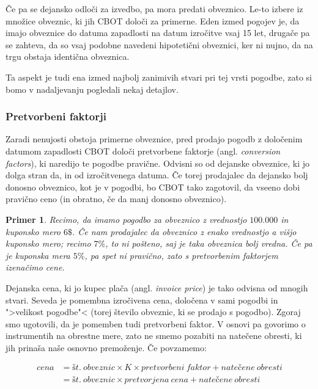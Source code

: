 \documentclass[a4paper, 11pt]{article}
\newtheorem{primer}{Primer}
\begin{document}
Če pa se dejansko odloči za izvedbo, pa mora predati obveznico. Le-to izbere iz množice obveznic, ki jih
CBOT določi za primerne. Eden izmed pogojev je, da imajo obveznice do datuma zapadlosti na datum izročitve
vsaj 15 let, drugače pa se zahteva, da so vsaj podobne navedeni hipotetični obveznici, ker ni nujno, da na
trgu obstaja identična obveznica. 

Ta aspekt je tudi ena izmed najbolj zanimivih stvari pri tej vrsti pogodbe, zato si bomo v nadaljevanju 
pogledali nekaj detajlov.


\subsubsection{Pretvorbeni faktorji}
Zaradi nenujosti obstoja primerne obveznice, pred prodajo pogodb z določenim datumom zapadlosti CBOT 
določi pretvorbene faktorje (angl. \textit{conversion factors}), ki naredijo te pogodbe pravične. 
Odvisni so od dejanske obveznice, ki jo dolga stran da, in od izročitvenega datuma. Če torej prodajalec
da dejansko bolj donosno obveznico, kot je v pogodbi, bo CBOT tako zagotovil, da vseeno dobi pravično
ceno (in obratno, če da manj donosno obveznico).

\begin{primer}
    Recimo, da imamo pogodbo za obveznico z vrednostjo \textdollar$100.000$ in kuponsko mero $6\$$. 
    Če nam prodajalec da obveznico z enako vrednostjo a višjo kuponsko mero; recimo $7\%$, to ni 
    pošteno, saj je taka obveznica bolj vredna. Če pa je kuponska mera $5\%$, pa spet ni pravično, 
    zato s pretvorbenim faktorjem izenačimo cene.
\end{primer}

Dejanska cena, ki jo kupec plača (angl. \textit{invoice price}) je tako odvisna od mnogih stvari. 
Seveda je pomembna izročivena cena, določena v sami pogodbi in ">velikost pogodbe"< (torej število
obveznic, ki se prodajo s pogodbo). Zgoraj smo ugotovili, da je pomemben tudi pretvorbeni faktor. 
V osnovi pa govorimo o instrumentih na obrestne mere, zato ne smemo pozabiti na natečene obresti, 
ki jih prinaša naše osnovno premoženje. Če povzamemo:

\begin{align*}
    cena 
    &= št.\:obveznic \times K \times pretvorbeni\:faktor + natečene\:obresti \\
    &= št.\:obveznic \times pretvorjena\:cena + natečene\:obresti
\end{align*}
\end{document}
